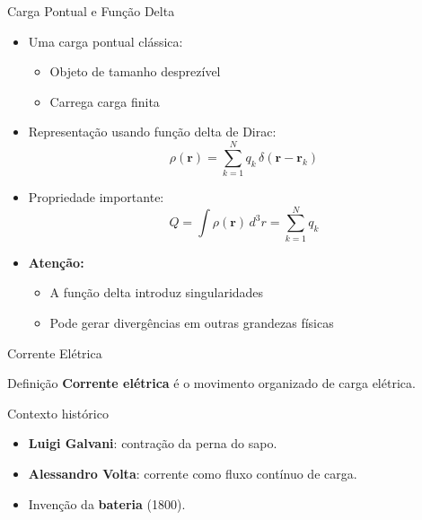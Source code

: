 \documentclass[aspectratio=169]{beamer}
\begin{document}
\begin{frame}{Carga Pontual e Função Delta}

\begin{itemize}
    \item Uma carga pontual clássica:
    \begin{itemize}
        \item Objeto de tamanho desprezível
        \item Carrega carga finita
    \end{itemize}
    
    \vspace{0.3cm}
    
    \item Representação usando função delta de Dirac:
    \begin{equation}
    \rho(\mathbf{r}) = \sum_{k=1}^{N} q_k\, \delta(\mathbf{r} - \mathbf{r}_k)
    \label{eq:delta_density}
    \end{equation}
    
    \vspace{0.3cm}
    
    \item Propriedade importante:
    \begin{equation}
    Q = \int \rho(\mathbf{r})\, d^3r = \sum_{k=1}^{N} q_k
    \label{eq:total_charge}
    \end{equation}
    
    \vspace{0.3cm}
    
    \item \textbf{Atenção:}
    \begin{itemize}
        \item A função delta introduz singularidades
        \item Pode gerar divergências em outras grandezas físicas
    \end{itemize}
\end{itemize}

\end{frame}

\begin{frame}{Corrente Elétrica}
\begin{block}{Definição}
\textbf{Corrente elétrica} é o movimento organizado de carga elétrica.
\end{block}

\begin{alertblock}{Contexto histórico}
\begin{itemize}
\item \textbf{Luigi Galvani}: contração da perna do sapo.
\item \textbf{Alessandro Volta}: corrente como fluxo contínuo de carga.
\item Invenção da \textbf{bateria} (1800).
\end{itemize}
\end{alertblock}
\end{frame}
\end{document}
